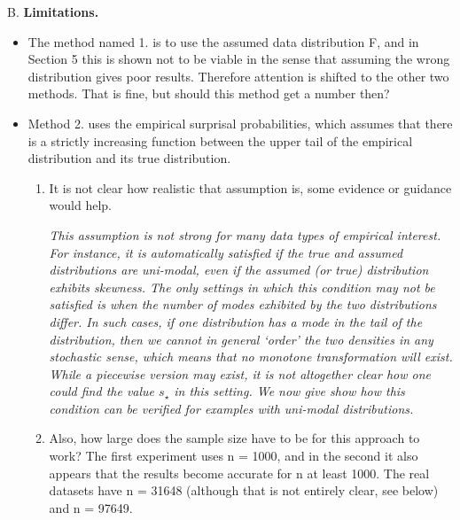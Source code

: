 \documentclass[a4paper,11pt]{article}
\begin{document}
\noindent B. \textbf{Limitations.}
\begin{itemize}
  \item[-]  The method named 1. is to use the assumed data distribution F, and in Section 5 this is shown not to be viable in the sense that assuming the wrong distribution gives poor results. Therefore attention is shifted to the other two methods. That is fine, but should this method get a number then?
  \item[-] Method 2. uses the empirical surprisal probabilities, which assumes that there is a strictly increasing function between the upper tail of the empirical distribution and its true distribution.
    \begin{enumerate}
      \item It is not clear how realistic that assumption is, some evidence or guidance would help.

        \noindent \textit{This assumption is not strong for many data types of empirical interest. For instance, it is automatically satisfied if the true and assumed distributions are uni-modal, even if the assumed (or true) distribution exhibits skewness. The only settings in which this condition may not be satisfied is when the number of modes exhibited by the two distributions differ. In such cases, if one distribution has a mode in the tail of the distribution, then we cannot in general `order' the two densities in any stochastic sense, which means that no monotone transformation will exist. While a piecewise version may exist, it is not altogether clear how one could find the value $s_\star$ in this setting. We now give show how this condition can be verified for examples with uni-modal distributions. }
      \item  Also, how large does the sample size have to be for this approach to work? The first experiment uses n = 1000, and in the second it also appears that the results become accurate for n at least 1000. The real datasets have n = 31648 (although that is not entirely clear, see below) and n = 97649.



\end{enumerate}
\end{itemize}
\end{document}
